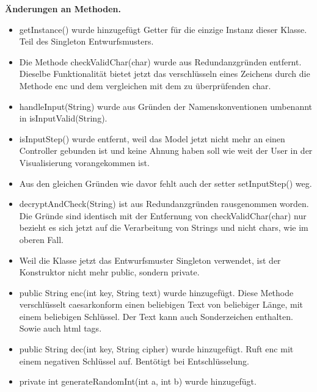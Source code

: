\documentclass{article}
\begin{document}
	  \textbf{Änderungen an Methoden.}\newline
            \begin{itemize}
             \item getInstance() wurde hinzugefügt\newline
                   Getter für die einzige Instanz dieser Klasse. Teil des Singleton Entwurfsmusters.
             \item Die Methode checkValidChar(char) wurde aus Redundanzgründen entfernt. 
                   Dieselbe Funktionalität bietet jetzt das verschlüsseln eines Zeichens
                   durch die Methode enc und dem vergleichen mit dem zu überprüfenden char.
             \item handleInput(String) wurde aus Gründen der Namenskonventionen umbenannt 
                   in isInputValid(String). 
             \item isInputStep() wurde entfernt, weil das Model jetzt nicht mehr an einen Controller gebunden ist
                   und keine Ahnung haben soll wie weit der User in der Visualisierung vorangekommen ist.
             \item Aus den gleichen Gründen wie davor fehlt auch der setter setInputStep() weg.
             \item decryptAndCheck(String) ist aus Redundanzgründen rausgenommen worden. Die Gründe sind identisch
                   mit der Entfernung von checkValidChar(char) nur bezieht es sich jetzt auf die Verarbeitung von
                   Strings und nicht chars, wie im oberen Fall.
             \item Weil die Klasse jetzt das Entwurfsmuster Singleton verwendet, ist der Konstruktor nicht mehr public,
                   sondern private.
             \item public String enc(int key, String text) wurde hinzugefügt.\newline
                   Diese Methode verschlüsselt caesarkonform einen beliebigen Text von beliebiger Länge, mit einem beliebigen Schlüssel.
                   Der Text kann auch Sonderzeichen enthalten. Sowie auch html tags.
             \item public String dec(int key, String cipher) wurde hinzugefügt.\newline
                   Ruft enc mit einem negativen Schlüssel auf. Bentötigt bei Entschlüsselung.
             \item private int generateRandomInt(int a, int b) wurde hinzugefügt.\newline

\end{itemize}
\end{document}
